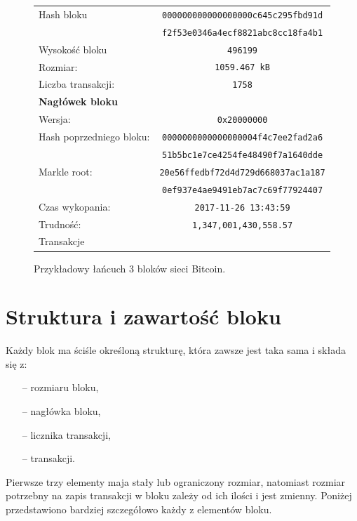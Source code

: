 \documentclass[12pt, oneside, final, openany]{mgr}
\begin{document}
\begin{figure}[H]
 	\begin{center}
	\begin{tabular}{ | l  c | }
		\hline   
     	Hash bloku &\texttt{000000000000000000c645c295fbd91d} \\
    			    & \texttt{f2f53e0346a4ecf8821abc8cc18fa4b1} \\ 
    	Wysokość bloku & \texttt{496199} \\ 
    	Rozmiar: & \texttt{1059.467 kB} \\
    	Liczba transakcji: & \texttt{1758} \\ \hline
		\textbf{Nagłówek bloku} & \\
		Wersja: & \texttt{0x20000000} \\
   	 	Hash poprzedniego bloku: & \texttt{0000000000000000004f4c7ee2fad2a6}\\
   	 							 & \texttt{51b5bc1e7ce4254fe48490f7a1640dde}\\
		Markle root: 			 & \texttt{20e56ffedbf72d4d729d668037ac1a187} \\
								 & \texttt{0ef937e4ae9491eb7ac7c69f77924407} \\
   		Czas wykopania: & \texttt{2017-11-26 13:43:59} \\
   		Trudność: & \texttt{1,347,001,430,558.57}\\
   		\hline
   		Transakcje &\\
   		\hline 
 	\end{tabular}
 	\end{center}
  	\caption{Przykładowy łańcuch 3 bloków sieci Bitcoin.}
	\label{fig:lancuchBlokow}
\end{figure}	

\section{Struktura i zawartość bloku}
\label{zawartoscBloku}
\indent Każdy blok ma ściśle określoną strukturę, która zawsze jest taka sama i składa się z:
\begin{itemize}
\item[--] rozmiaru bloku,
\item[--] nagłówka bloku,
\item[--] licznika transakcji,
\item[--] transakcji.
\end{itemize}

\indent Pierwsze trzy elementy maja stały lub ograniczony rozmiar, natomiast rozmiar potrzebny na zapis transakcji w bloku zależy od ich ilości i jest zmienny. Poniżej przedstawiono bardziej szczegółowo każdy z elementów bloku. 
\end{document}
